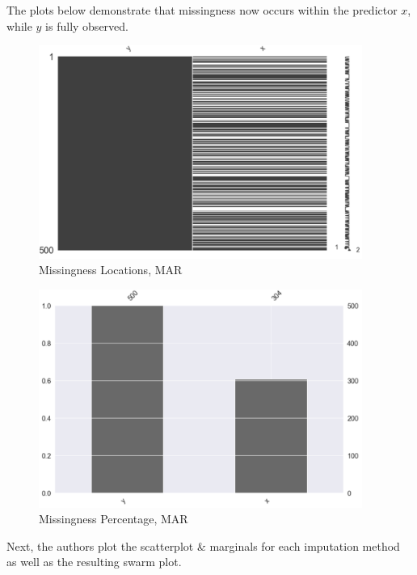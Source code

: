 \documentclass[12pt,oneside]{chicagocapstone}
\begin{document}
The plots below demonstrate that missingness now occurs within the
predictor \(x\), while \(y\) is fully observed.
\begin{figure}

{\centering \includegraphics[width=400px]{figure/x-mis-forty-loc-mar} 

}

\caption{Missingness Locations, MAR}\label{fig:x-mis-forty-loc-mar}
\end{figure}
\begin{figure}

{\centering \includegraphics[width=400px]{figure/x-mis-forty-bar-mar} 

}

\caption{Missingness Percentage, MAR}\label{fig:x-mis-forty-bar-mar}
\end{figure}
Next, the authors plot the scatterplot \& marginals for each imputation
method as well as the resulting swarm plot.
\end{document}
